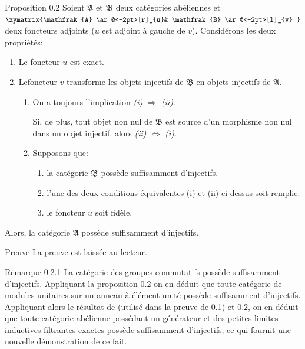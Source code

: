 \begin{enonce*}{Proposition 0.2}
Soient $\mathfrak{A}$ et $\mathfrak{B}$ deux
  catégories abéliennes et
$\xymatrix{\mathfrak{A} \ar@<-2pt>[r]_{u}& \mathfrak{B} \ar@<-2pt>[l]_{v}
}
$
deux foncteurs adjoints ($u$ est adjoint à gauche de
$v$). Considérons les deux propriétés:
\begin{enumerate}
\renewcommand{\theenumi}{\roman{enumi}}
\renewcommand{\labelenumi}{\theenumi)}
\item Le foncteur $u$ est exact.

\item Le\pageoriginale foncteur $v$ transforme les objets injectifs de $\mathfrak{B}$
  en objets injectifs de $\mathfrak{A}$.
\begin{enumerate}
\renewcommand{\theenumii}{\arabic {enumii}}
\renewcommand{\labelenumii}{\theenumii)}
\item On a toujours l'implication \emph{(i) $\Rightarrow$ (ii)}.

Si, de plus, tout objet non nul de $\mathfrak{B}$ est source d'un morphisme non
  nul dans un objet injectif, alors \emph{(ii) $\Leftrightarrow$ (i)}.
\item Supposons que:
\begin{enumerate}
\renewcommand{\theenumiii}{\alph {enumiii}}
\renewcommand{\labelenumiii}{\theenumiii)}
\item la catégorie $\mathfrak{B}$ possède suffisamment
  d'injectifs.
\item l'une des deux conditions équivalentes {\rm(i)} et {\rm(ii)} ci-dessus
  soit remplie.
\item le foncteur $u$ soit fidèle.
\end{enumerate}
\end{enumerate}
\end{enumerate}
Alors, la catégorie $\mathfrak{A}$ possède suffisamment d'injectifs.
\end{enonce*}

\begin{enonce*}[remark]{Preuve}
La preuve est laissée au lecteur.
\end{enonce*}

\begin{enonce*}[remark]{Remarque 0.2.1}
La catégorie des groupes commutatifs possède suffisamment
d'injectifs. Appliquant la proposition \hyperref[V.prop0.2]{0.2} on en déduit que toute
catégorie de modules unitaires sur un anneau à élément unité
possède suffisamment d'injectifs. Appliquant alors le résultat de
\cite{5} (utilisé dans la preuve de \hyperref[V.prop0.1]{0.1}) et \hyperref[V.prop0.2]{0.2}, on en déduit que toute
catégorie abélienne possédant un générateur et des petites
limites inductives filtrantes exactes possède suffisamment
d'injectifs; ce qui fournit une nouvelle démonstration de ce fait.
\end{enonce*}

